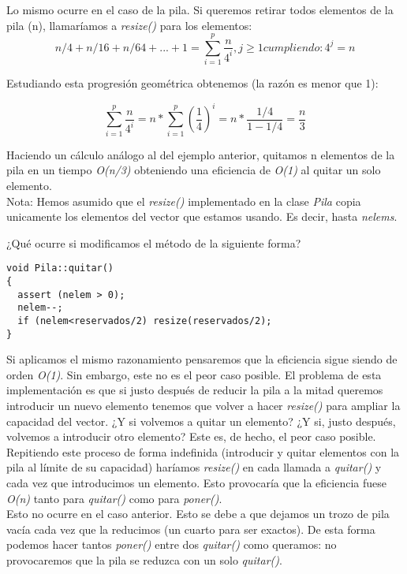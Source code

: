 \documentclass[11pt,a4paper]{article}
\begin{document}
Lo mismo ocurre en el caso de la pila. Si queremos retirar todos elementos de la pila (n), llamaríamos a \emph{resize()} para los elementos:
$$ n/4 + n/16 + n/64 + ... + 1  = \sum_{i=1}^{p}{\frac{n}{4^i}},j\geq1 cumpliendo: 4^j = n$$ 

Estudiando esta progresión geométrica obtenemos (la razón es menor que 1):

$$ \sum_{i=1}^{p}{\frac{n}{4^i}} = n * \sum_{i=1}^{p}{(\frac{1}{4})^i} = n * \frac{1/4}{1-1/4} = \frac{n}{3}$$

Haciendo un cálculo análogo al del ejemplo anterior, quitamos n elementos de la pila en un tiempo \emph{O(n/3)} obteniendo una eficiencia de \emph{O(1)} al quitar un solo elemento. \\

Nota: Hemos asumido que el \emph{resize()} implementado en la clase \emph{Pila} copia unicamente los elementos del vector que estamos usando. Es decir, hasta \emph{nelems}.

¿Qué ocurre si modificamos el método de la siguiente forma?

\begin{lstlisting}
void Pila::quitar() 
{
  assert (nelem > 0);
  nelem--;
  if (nelem<reservados/2) resize(reservados/2);	
}
\end{lstlisting}

Si aplicamos el mismo razonamiento pensaremos que la eficiencia sigue siendo de orden \emph{O(1)}. Sin embargo, este no es el peor caso posible. El problema de esta implementación es que si justo después de reducir la pila a la mitad queremos introducir un nuevo elemento tenemos que volver a hacer \emph{resize()} para ampliar la capacidad del vector. ¿Y si volvemos a quitar un elemento? ¿Y si, justo después, volvemos a introducir otro elemento? Este es, de hecho, el peor caso posible.\\

Repitiendo este proceso de forma indefinida (introducir y quitar elementos con la pila al límite de su capacidad) haríamos \emph{resize()} en cada llamada a \emph{quitar()} y cada vez que introducimos un elemento. Esto provocaría que la eficiencia fuese \emph{O(n)} tanto para \emph{quitar()} como para \emph{poner()}. \\

Esto no ocurre en el caso anterior. Esto se debe a que dejamos un trozo de pila vacía cada vez que la reducimos (un cuarto para ser exactos). De esta forma podemos hacer tantos \emph{poner()} entre dos \emph{quitar()} como queramos: no provocaremos que la pila se reduzca con un solo \emph{quitar()}.
\end{document}
